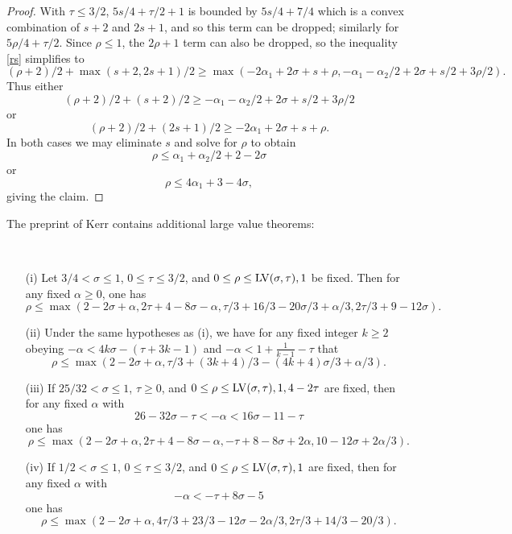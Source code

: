\begin{proof}  With $\tau \leq 3/2$, $5s/4+\tau/2+1$ is bounded by $5s/4+7/4$ which is a convex combination of $s+2$ and $2s+1$, and so this term can be dropped; similarly for $5\rho/4+\tau/2$.  Since $\rho \leq 1$, the $2\rho+1$ term can also be dropped, so the inequality \eqref{rs} simplifies to
$$(\rho+2)/2 + \max(s+2, 2s+1)/2 \geq
    \max( -2\alpha_1 + 2\sigma + s + \rho, -\alpha_1 - \alpha_2/2 + 2\sigma + s/2 + 3\rho/2).$$
Thus either
$$(\rho+2)/2 + (s+2)/2 \geq -\alpha_1 - \alpha_2/2 + 2\sigma + s/2 + 3\rho/2$$
or
$$(\rho+2)/2 + (2s+1)/2 \geq  -2\alpha_1 + 2\sigma + s + \rho.$$
In both cases we may eliminate $s$ and solve for $\rho$ to obtain
$$ \rho \leq \alpha_1 + \alpha_2/2 + 2 - 2 \sigma $$
or
$$ \rho \leq 4\alpha_1 + 3 - 4 \sigma,$$
giving the claim.
\end{proof}


The preprint of Kerr \cite{kerr} contains additional large value theorems:

\begin{lemma}\label{kerr-thm}\
    \begin{itemize}
    \item[(i)]\cite[Theorem 2]{kerr} Let $3/4 < \sigma \leq 1$, $0 \leq \tau \leq 3/2$, and $0 \leq \rho \leq \mathrm{LV}(\sigma,\tau), 1$ be fixed.  Then for any fixed $\alpha \geq 0$, one has
    $$ \rho \leq \max( 2-2\sigma+\alpha, 2\tau+4-8\sigma-\alpha, \tau/3+16/3 -20\sigma/3 + \alpha/3, 2\tau/3+9-12\sigma).$$
    \item[(ii)] \cite[Theorem 3]{kerr} Under the same hypotheses as (i), we have for any fixed integer $k \geq 2$ obeying
    $-\alpha < 4k\sigma -(\tau+3k-1)$ and $-\alpha < 1 + \frac{1}{k-1} - \tau$ that
    $$ \rho \leq \max(2-2\sigma+\alpha, \tau/3+(3k+4)/3-(4k+4)\sigma/3 + \alpha/3).$$
    \item[(iii)] \cite[Theorem 4]{kerr} If $25/32 < \sigma \leq 1$, $\tau \geq 0$, and $0 \leq \rho \leq \mathrm{LV}(\sigma,\tau), 1, 4-2\tau$ are fixed, then for any fixed $\alpha$ with
    $$ 26 - 32 \sigma - \tau < - \alpha < 16\sigma -11-\tau$$
    one has
    $$ \rho \leq \max( 2-2\sigma+\alpha, 2\tau+4-8\sigma-\alpha, -\tau+8-8\sigma+2\alpha, 10-12\sigma+2\alpha/3).$$
    \item[(iv)] \cite[Theorem 5]{kerr} If $1/2 < \sigma \leq 1$, $0 \leq \tau \leq 3/2$, and $0 \leq \rho \leq \mathrm{LV}(\sigma,\tau), 1$ are fixed, then for any fixed $\alpha$ with
    $$ - \alpha < -\tau + 8\sigma - 5$$
    one has
    $$ \rho \leq \max(2-2\sigma+\alpha, 4\tau/3 +23/3 - 12\sigma - 2\alpha/3, 2\tau/3 + 14/3 - 20/3 ).$$
\end{itemize}
\end{lemma}

